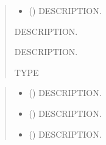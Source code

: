 \documentclass[letterpaper,10pt,english]{sphinxmanual}
\begin{document}
\begin{fulllineitems}
\begin{fulllineitems}
\begin{quote}
\begin{description}
\begin{itemize}
\item {} 
\sphinxAtStartPar
{} () \textendash{} DESCRIPTION.

\end{itemize}

\sphinxAtStartPar
{} \textendash{} DESCRIPTION.

\sphinxAtStartPar
{} \textendash{} DESCRIPTION.

\sphinxAtStartPar
TYPE

\end{description}\end{quote}

\end{fulllineitems}


\begin{fulllineitems}
\label{\detokenize{query:ggcas.query.GaiaQuery.getAstrometry}}
\pysigstartsignatures
{}
\pysigstopsignatures\begin{quote}\begin{description}
\begin{itemize}
\item {} 
\sphinxAtStartPar
{} () \textendash{} DESCRIPTION.

\item {} 
\sphinxAtStartPar
{} () \textendash{} DESCRIPTION.

\item {} 
\sphinxAtStartPar
{} () \textendash{} DESCRIPTION.


\end{itemize}
\end{description}
\end{quote}
\end{fulllineitems}
\end{fulllineitems}
\end{document}
